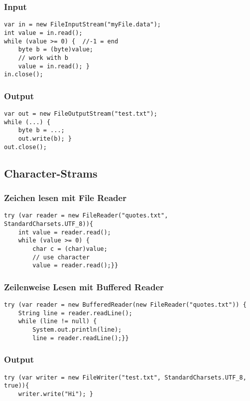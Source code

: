 \begin{multicols*}{5}
		\subsubsection{Input}
			\begin{lstlisting}
var in = new FileInputStream("myFile.data"); 
int value = in.read(); 
while (value >= 0) {  //-1 = end
	byte b = (byte)value;
	// work with b
	value = in.read(); }
in.close();
			\end{lstlisting}
		

		\subsubsection{Output}
			\begin{lstlisting}
var out = new FileOutputStream("test.txt"); 
while (...) {
	byte b = ...;
	out.write(b); }
out.close(); 
			\end{lstlisting}

	\subsection{Character-Strams}
		\subsubsection{Zeichen lesen mit File Reader}
			\begin{lstlisting}
try (var reader = new FileReader("quotes.txt", StandardCharsets.UTF_8)){ 
	int value = reader.read();
	while (value >= 0) {
		char c = (char)value;
		// use character
		value = reader.read();}}
			\end{lstlisting}
			\subsubsection{Zeilenweise Lesen mit Buffered Reader}
			\begin{lstlisting}
try (var reader = new BufferedReader(new FileReader("quotes.txt")) {
	String line = reader.readLine(); 
	while (line != null) {
		System.out.println(line);
		line = reader.readLine();}}
			\end{lstlisting}
			\subsubsection{Output}
				\begin{lstlisting}
try (var writer = new FileWriter("test.txt", StandardCharsets.UTF_8, true)){
	writer.write("Hi");	}
				\end{lstlisting} 


\end{multicols*}
